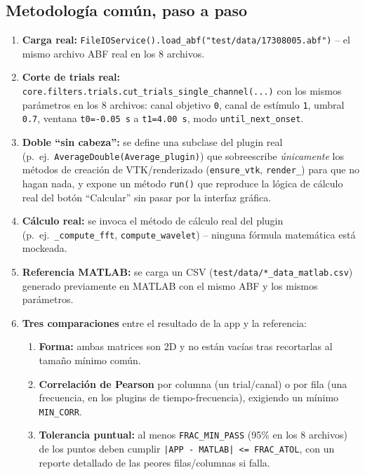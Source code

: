\documentclass[11pt,a4paper]{article}
\begin{document}
\subsection{Metodología común, paso a paso}

\begin{enumerate}
  \item \textbf{Carga real:} \texttt{FileIOService().load\_\allowbreak abf("test/data/17308005.abf")} -- el mismo
        archivo ABF real en los 8 archivos.
  \item \textbf{Corte de trials real:} \texttt{core.filters.trials.cut\_\allowbreak trials\_\allowbreak single\_\allowbreak channel(...)} con los
        mismos parámetros en los 8 archivos: canal objetivo \texttt{0}, canal de estímulo \texttt{1}, umbral
        \texttt{0.7}, ventana \texttt{t0=-0.05\,s} a \texttt{t1=4.00\,s}, modo \texttt{until\_\allowbreak next\_\allowbreak onset}.
  \item \textbf{Doble ``sin cabeza'':} se define una subclase del plugin real (p.\ ej.\
        \texttt{AverageDouble(Average\_\allowbreak plugin)}) que sobreescribe \emph{únicamente} los métodos de
        creación de VTK/renderizado (\texttt{ensure\_\allowbreak vtk}, \texttt{render\_\allowbreak *}) para que no hagan nada, y
        expone un método \texttt{run()} que reproduce la lógica de cálculo real del botón ``Calcular'' sin
        pasar por la interfaz gráfica.
  \item \textbf{Cálculo real:} se invoca el método de cálculo real del plugin (p.\ ej.\
        \texttt{\_\allowbreak compute\_\allowbreak fft}, \texttt{compute\_\allowbreak wavelet}) -- ninguna fórmula matemática está mockeada.
  \item \textbf{Referencia MATLAB:} se carga un CSV (\texttt{test/data/*\_\allowbreak data\_\allowbreak matlab.csv}) generado
        previamente en MATLAB con el mismo ABF y los mismos parámetros.
  \item \textbf{Tres comparaciones} entre el resultado de la app y la referencia:
  \begin{enumerate}[label=(\alph*)]
    \item \textbf{Forma:} ambas matrices son 2D y no están vacías tras recortarlas al tamaño mínimo común.
    \item \textbf{Correlación de Pearson} por columna (un trial/canal) o por fila (una frecuencia, en los
          plugins de tiempo-frecuencia), exigiendo un mínimo \texttt{MIN\_\allowbreak CORR}.
    \item \textbf{Tolerancia puntual:} al menos \texttt{FRAC\_\allowbreak MIN\_\allowbreak PASS} (95\% en los 8 archivos) de los
          puntos deben cumplir \texttt{|APP - MATLAB| <= FRAC\_\allowbreak ATOL}, con un reporte detallado de las peores
          filas/columnas si falla.
  \end{enumerate}
\end{enumerate}
\end{document}
